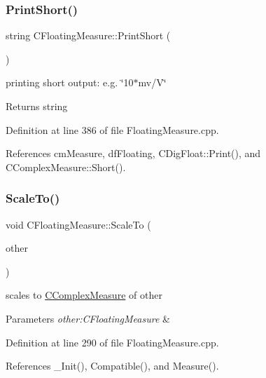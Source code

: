 \subsubsection{\texorpdfstring{Print\+Short()}{PrintShort()}}
{\footnotesize\ttfamily string C\+Floating\+Measure\+::\+Print\+Short (\begin{DoxyParamCaption}{ }\end{DoxyParamCaption})}



printing short output\+: e.\+g. \char`\"{}10$\ast$mv/\+V\char`\"{} 

\begin{DoxyReturn}{Returns}
string 
\end{DoxyReturn}


Definition at line 386 of file Floating\+Measure.\+cpp.



References cm\+Measure, df\+Floating, C\+Dig\+Float\+::\+Print(), and C\+Complex\+Measure\+::\+Short().

\mbox{\label{classCFloatingMeasure_aa0a16f8516d047576b588389504c0996}} 
\subsubsection{\texorpdfstring{Scale\+To()}{ScaleTo()}\hspace{0.1cm}{\footnotesize\ttfamily [1/2]}}
{\footnotesize\ttfamily void C\+Floating\+Measure\+::\+Scale\+To (\begin{DoxyParamCaption}\item[{const \hyperlink{classCFloatingMeasure}{C\+Floating\+Measure} \&}]{other }\end{DoxyParamCaption})}



scales to \hyperlink{classCComplexMeasure}{C\+Complex\+Measure} of other 


\begin{DoxyParams}{Parameters}
{\em other\+:\+C\+Floating\+Measure} & \\
\hline
\end{DoxyParams}


Definition at line 290 of file Floating\+Measure.\+cpp.



References \+\_\+\+Init(), Compatible(), and Measure().


